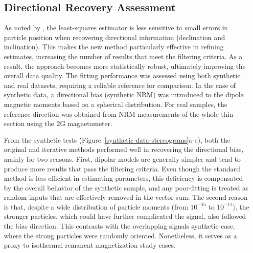 \subsection{Directional Recovery Assessment}

As noted by \citet{Oliveira2015Estimation}, the least-squares estimator is less sensitive to small errors in particle position when recovering directional information (declination and inclination). This makes the new method particularly effective in refining estimates, increasing the number of results that meet the filtering criteria. As a result, the approach becomes more statistically robust, ultimately improving the overall data quality. The fitting performance was assessed using both synthetic and real datasets, requiring a reliable reference for comparison. In the case of synthetic data, a directional bias (synthetic NRM) was introduced to the dipole magnetic moments based on a spherical distribution. For real samples, the reference direction was obtained from NRM measurements of the whole thin-section using the 2G magnetometer.

From the synthetic tests (Figure~\ref{synthetic-data-stereograms}a-c), both the original \citep{Souza-Junior2024} and iterative methods performed well in recovering the directional bias, mainly for two reasons. First, dipolar models are generally simpler and tend to produce more results that pass the filtering criteria. Even though the standard method is less efficient in estimating parameters, this deficiency is compensated by the overall behavior of the synthetic sample, and any poor-fitting is treated as random inputs that are effectively removed in the vector sum. The second reason is that, despite a wide distribution of particle moments (from \(10^{-15}\) to \(10^{-11}\)), the stronger particles, which could have further complicated the signal, also followed the bias direction. This contrasts with the overlapping signals synthetic case, where the strong particles were randomly oriented. Nonetheless, it serves as a proxy to isothermal remanent magnetization study cases.

